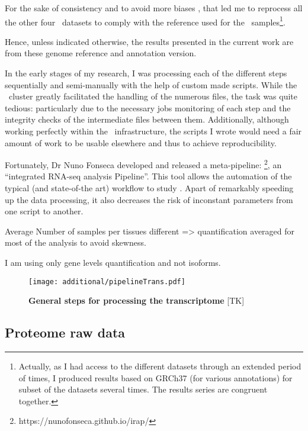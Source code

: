 For the sake of consistency and to avoid more biases \citep{h38vsh37},
that led me to reprocess all the other four \Rnaseq\ datasets
to comply with the reference used for the \Gtex\ samples\footnote{Actually,
as I had access to the different datasets through an extended period of
times, I produced results based on GRCh37 (for various annotations) for subset of
the datasets several times. The results series are congruent together.}.

Hence, unless indicated otherwise, the results presented in the current work are
from these genome reference and annotation version.

In the early stages of my research, I was processing each of the different steps
sequentially and semi-manually with the help of custom made scripts.
While the \EBI\ cluster greatly facilitated the handling of the numerous files,
the task was quite tedious: particularly due to the necessary jobs monitoring of
each step and the integrity checks of the intermediate files between them.
Additionally, although working perfectly within the \EBI\ infrastructure,
the scripts I wrote would need a fair amount of work to be usable elsewhere and
thus to achieve reproducibility.

Fortunately, Dr Nuno Fonseca developed and released a meta-pipeline:
\irap\footnote{https://nunofonseca.github.io/irap/}, an ``integrated RNA-seq
analysis Pipeline''. This tool allows
the automation of the typical (and state-of-the art) workflow to study
\Rnaseq. Apart of remarkably speeding up the data processing, it also
decreases the risk of inconstant parameters from one script to another.



Average Number of samples per tissues different => quantification averaged for
most of the analysis to avoid skewness.

I am using only gene levels quantification and not isoforms.




\begin{figure}
    \texttt{[image: additional/pipelineTrans.pdf]}\centering
    \caption[General steps for processing the transcriptomic
    data]{\label{fig:pipelineTrans}\textbf{General steps for processing the
    transcriptome} [TK]}
  \end{figure}


\subsection{Proteome raw data}

